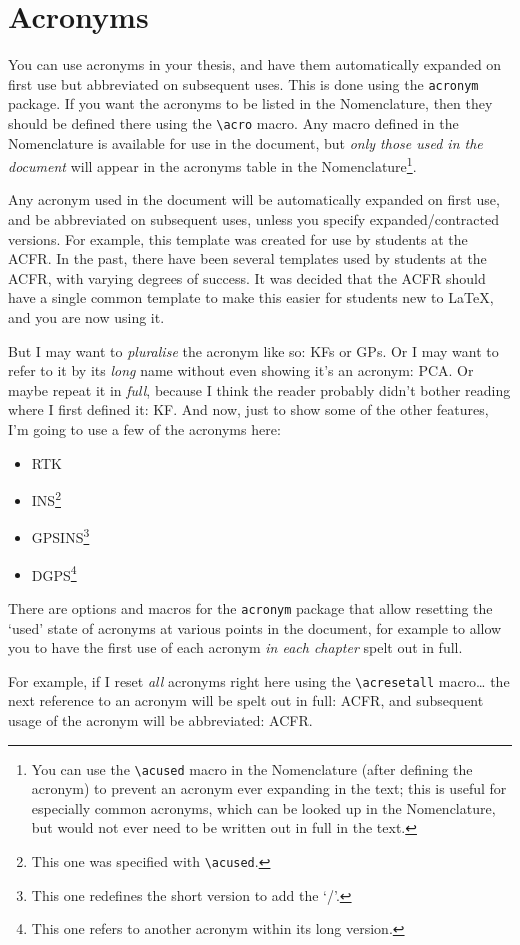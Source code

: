 
\section{Acronyms}\label{sec:acronyms}

You can use acronyms in your thesis, and have them automatically expanded on first use but abbreviated on subsequent uses. This is done using the \texttt{acronym} package. If you want the acronyms to be listed in the Nomenclature, then they should be defined there using the \texttt{\textbackslash{}acro} macro. Any macro defined in the Nomenclature is available for use in the document, but \emph{only those used in the document} will appear in the acronyms table in the Nomenclature\footnote{You can use the \texttt{\textbackslash{}acused} macro in the Nomenclature (after defining the acronym) to prevent an acronym ever expanding in the text; this is useful for especially common acronyms, which can be looked up in the Nomenclature, but would not ever need to be written out in full in the text.}.

Any acronym used in the document will be automatically expanded on first use, and be abbreviated on subsequent uses, unless you specify expanded/contracted versions. For example, this template was created for use by students at the \ac{ACFR}. In the past, there have been several templates used by students at the \ac{ACFR}, with varying degrees of success. It was decided that the \ac{ACFR} should have a single common template to make this easier for students new to \LaTeX{}, and you are now using it.

But I may want to \emph{pluralise} the acronym like so: \acp{KF} or \acp{GP}. Or I may want to refer to it by its \emph{long} name without even showing it's an acronym: \acl{PCA}. Or maybe repeat it in \emph{full}, because I think the reader probably didn't bother reading where I first defined it: \acf{KF}. And now, just to show some of the other features, I'm going to use a few of the acronyms here:

\begin{itemize}[nolistsep]
    \item \ac{RTK}
    \item \ac{INS}\footnote{This one was specified with \texttt{\textbackslash{}acused}.}
    \item \ac{GPSINS}\footnote{This one redefines the short version to add the `/'.}
    \item \ac{DGPS}\footnote{This one refers to another acronym within its long version.}
\end{itemize}

There are options and macros for the \texttt{acronym} package that allow resetting the `used' state of acronyms at various points in the document, for example to allow you to have the first use of each acronym \emph{in each chapter} spelt out in full. 

For example, if I reset \emph{all} acronyms right here using the \texttt{\textbackslash{}acresetall} macro\dots
\acresetall{}
the next reference to an acronym will be spelt out in full: \ac{ACFR}, and subsequent usage of the acronym will be abbreviated: \ac{ACFR}.
